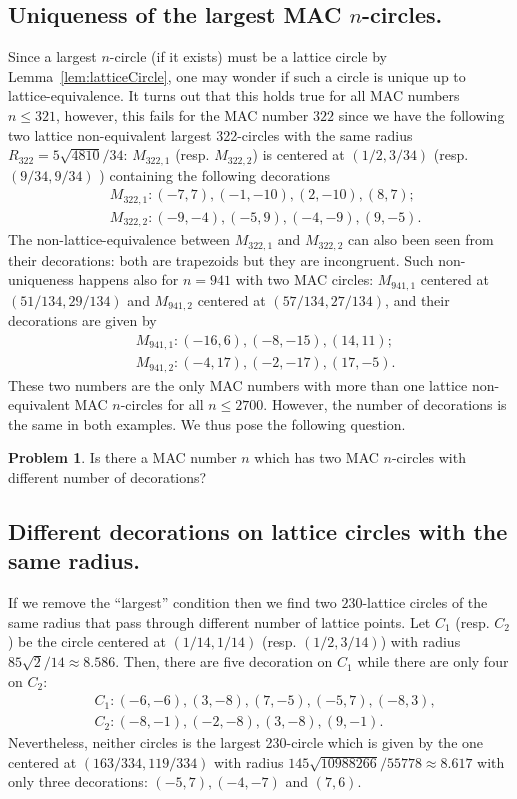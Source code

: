 \documentclass{article}
\theoremstyle{theorem}
\theoremstyle{definition}
\newtheorem{problem}[theorem]{Problem}
\begin{document}
\subsection{Uniqueness of the largest MAC $n$-circles.}
Since a largest $n$-circle (if it exists) must be a lattice circle by Lemma~\ref{lem:latticeCircle}, one may wonder if such a circle is unique up to lattice-equivalence. It turns out that this holds true for all MAC numbers $n\le 321$, however, this fails for the MAC number $322$ since we have the following two lattice non-equivalent largest 322-circles with the same radius $R_{322}=5\sqrt{4810}/34$: $M_{322,1}$ (resp. $M_{322,2}$) is centered at $(1/2,3/34)$ (resp. $(9/34,9/34)$ ) containing the following decorations
\begin{align*}
& M_{322,1}: (-7, 7), (-1, -10), (2, -10), (8, 7);\\
& M_{322,2}: (-9, -4), (-5, 9), (-4, -9), (9, -5).
\end{align*}
The non-lattice-equivalence between $M_{322,1}$ and $M_{322,2}$ can also been seen from their decorations: both are trapezoids but they are incongruent. Such non-uniqueness happens also for $n=941$ with two MAC circles: $M_{941,1}$ centered at $(51/134,29/134)$ and $M_{941,2}$ centered at $(57/134,27/134)$, and their decorations are given by
\begin{align*}
& M_{941,1}: (-16,6),(-8,-15),(14,11);\\
& M_{941,2}: (-4,17),(-2,-17),(17,-5).
\end{align*}
These two numbers are the only MAC numbers with more than one lattice non-equivalent MAC $n$-circles for all $n\le 2700$.
However, the number of decorations is the same in both examples. We thus pose the following question.

\begin{problem}\label{prob:decor}
Is there a MAC number $n$ which has two MAC $n$-circles with different number of decorations?
\end{problem}

\subsection{Different decorations on lattice circles with the same radius.}
If we remove the ``largest'' condition then we find two $230$-lattice circles of the same radius that pass through different number of lattice points. Let $C_1$ (resp. $C_2$) be the circle centered at $(1/14,1/14)$ (resp. $(1/2,3/14)$) with radius $85\sqrt{2}/14\approx 8.586$. Then, there are five decoration on $C_1$ while there are only four on $C_2$:
\begin{align*}
& C_1: (-6, -6), (3,-8),(7,-5),(-5,7),(-8,3),\\
& C_2: (-8, -1), (-2, -8), (3, -8), (9, -1).
\end{align*}
Nevertheless, neither circles is the largest 230-circle which is given by the one centered at $(163/334,119/334)$ with radius $145 \sqrt{10988266}/55778\approx 8.617$ with only three decorations: $(-5, 7), (-4, -7)$ and $(7, 6)$.
\end{document}
